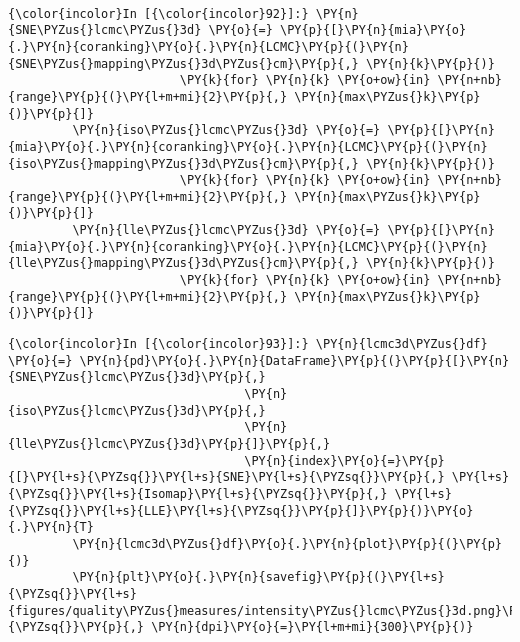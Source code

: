     \begin{center}
    \end{center}
    { \hspace*{\fill} \\}

    \begin{Verbatim}[commandchars=\\\{\}]
{\color{incolor}In [{\color{incolor}92}]:} \PY{n}{SNE\PYZus{}lcmc\PYZus{}3d} \PY{o}{=} \PY{p}{[}\PY{n}{mia}\PY{o}{.}\PY{n}{coranking}\PY{o}{.}\PY{n}{LCMC}\PY{p}{(}\PY{n}{SNE\PYZus{}mapping\PYZus{}3d\PYZus{}cm}\PY{p}{,} \PY{n}{k}\PY{p}{)}
                        \PY{k}{for} \PY{n}{k} \PY{o+ow}{in} \PY{n+nb}{range}\PY{p}{(}\PY{l+m+mi}{2}\PY{p}{,} \PY{n}{max\PYZus{}k}\PY{p}{)}\PY{p}{]}
         \PY{n}{iso\PYZus{}lcmc\PYZus{}3d} \PY{o}{=} \PY{p}{[}\PY{n}{mia}\PY{o}{.}\PY{n}{coranking}\PY{o}{.}\PY{n}{LCMC}\PY{p}{(}\PY{n}{iso\PYZus{}mapping\PYZus{}3d\PYZus{}cm}\PY{p}{,} \PY{n}{k}\PY{p}{)}
                        \PY{k}{for} \PY{n}{k} \PY{o+ow}{in} \PY{n+nb}{range}\PY{p}{(}\PY{l+m+mi}{2}\PY{p}{,} \PY{n}{max\PYZus{}k}\PY{p}{)}\PY{p}{]}
         \PY{n}{lle\PYZus{}lcmc\PYZus{}3d} \PY{o}{=} \PY{p}{[}\PY{n}{mia}\PY{o}{.}\PY{n}{coranking}\PY{o}{.}\PY{n}{LCMC}\PY{p}{(}\PY{n}{lle\PYZus{}mapping\PYZus{}3d\PYZus{}cm}\PY{p}{,} \PY{n}{k}\PY{p}{)}
                        \PY{k}{for} \PY{n}{k} \PY{o+ow}{in} \PY{n+nb}{range}\PY{p}{(}\PY{l+m+mi}{2}\PY{p}{,} \PY{n}{max\PYZus{}k}\PY{p}{)}\PY{p}{]}
\end{Verbatim}

    \begin{Verbatim}[commandchars=\\\{\}]
{\color{incolor}In [{\color{incolor}93}]:} \PY{n}{lcmc3d\PYZus{}df} \PY{o}{=} \PY{n}{pd}\PY{o}{.}\PY{n}{DataFrame}\PY{p}{(}\PY{p}{[}\PY{n}{SNE\PYZus{}lcmc\PYZus{}3d}\PY{p}{,}
                                 \PY{n}{iso\PYZus{}lcmc\PYZus{}3d}\PY{p}{,}
                                 \PY{n}{lle\PYZus{}lcmc\PYZus{}3d}\PY{p}{]}\PY{p}{,}
                                 \PY{n}{index}\PY{o}{=}\PY{p}{[}\PY{l+s}{\PYZsq{}}\PY{l+s}{SNE}\PY{l+s}{\PYZsq{}}\PY{p}{,} \PY{l+s}{\PYZsq{}}\PY{l+s}{Isomap}\PY{l+s}{\PYZsq{}}\PY{p}{,} \PY{l+s}{\PYZsq{}}\PY{l+s}{LLE}\PY{l+s}{\PYZsq{}}\PY{p}{]}\PY{p}{)}\PY{o}{.}\PY{n}{T}
         \PY{n}{lcmc3d\PYZus{}df}\PY{o}{.}\PY{n}{plot}\PY{p}{(}\PY{p}{)}
         \PY{n}{plt}\PY{o}{.}\PY{n}{savefig}\PY{p}{(}\PY{l+s}{\PYZsq{}}\PY{l+s}{figures/quality\PYZus{}measures/intensity\PYZus{}lcmc\PYZus{}3d.png}\PY{l+s}{\PYZsq{}}\PY{p}{,} \PY{n}{dpi}\PY{o}{=}\PY{l+m+mi}{300}\PY{p}{)}
\end{Verbatim}

